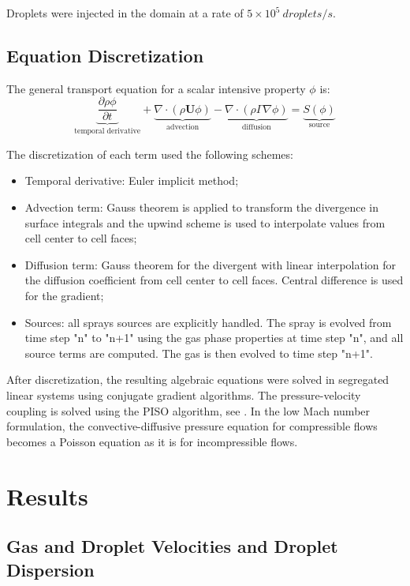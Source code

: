 \documentclass[preprint,12pt,review]{elsarticle}
\newcommand{\bv}[1]{\mathbf{#1}}
\begin{document}
Droplets were injected in the domain at a rate of $5 \times 10^5\ droplets/s$.

\subsection{Equation Discretization}

The general transport equation for a scalar intensive property $\phi$ is:
\begin{equation}
 \underbrace{\frac{\partial \rho \phi}{\partial t}}_{\text{temporal derivative}} + \underbrace{\nabla \cdot \left(\rho \bv{U} \phi \right)}_{\text{advection}} - \underbrace{\nabla \cdot \left( \rho \Gamma \nabla \phi \right)}_{\text{diffusion}} = \underbrace{S\left(\phi\right)}_{\text{source}}
\end{equation}

The discretization of each term used the following schemes:
\begin{itemize}
 \item Temporal derivative: Euler implicit method;
 \item Advection term: Gauss theorem is applied to transform the divergence in surface integrals and the upwind scheme is used to interpolate values from cell center to cell faces;
 \item Diffusion term: Gauss theorem for the divergent with linear interpolation for the diffusion coefficient from cell center to cell faces. Central difference is used for the gradient;
 \item Sources: all sprays sources are explicitly handled. The spray is evolved from time step "n" to "n+1" using the gas phase properties at time step "n", and all source terms are computed. The gas is then evolved to time step "n+1".
\end{itemize}

After discretization, the resulting algebraic equations were solved in segregated linear systems using conjugate gradient algorithms.
The pressure-velocity coupling is solved using the PISO algorithm, see \citet{issa}. In the low Mach number formulation, the convective-diffusive pressure equation for compressible flows becomes a Poisson equation as it is for incompressible flows.

\section{Results}

\subsection{Gas and Droplet Velocities and Droplet Dispersion}
\end{document}
